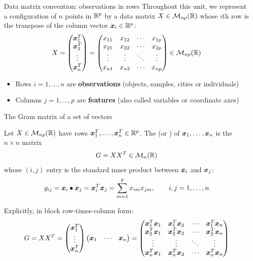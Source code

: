 \documentclass[aspectratio=169]{beamer}\usepackage[]{graphicx}\usepackage[]{xcolor}
\begin{document}


\begin{frame}{Data matrix convention: observations in rows}
Throughout this unit, we represent a configuration of $n$ points in $\mathbb{R}^p$ by a data matrix $X\in\mathcal{M}_{np}(\mathbb{R})$ whose $i$th row is the transpose of the column vector $\bm{x}_i\in\mathbb{R}^p$:
\[
X = \begin{pmatrix}
\bm{x}_1^T \\
\bm{x}_2^T \\
\vdots \\
\bm{x}_n^T
\end{pmatrix}
= \begin{pmatrix}
x_{11} & x_{12} & \cdots & x_{1p} \\
x_{21} & x_{22} & \cdots & x_{2p} \\
\vdots & \vdots & \ddots & \vdots \\
x_{n1} & x_{n2} & \cdots & x_{np}
\end{pmatrix} \in \mathcal{M}_{np}(\mathbb{R})
\]
\vfill
\begin{itemize}
\item Rows $i=1,\ldots,n$ are \textbf{observations} (objects, samples, cities or individuals)
\item Columns $j=1,\ldots,p$ are \textbf{features} (also called variables or coordinate axes)
\end{itemize}
\end{frame}

\begin{frame}{The Gram matrix of a set of vectors}
\begin{importantdefinition}
Let $X\in\mathcal{M}_{np}(\mathbb{R})$ have rows $\bm{x}_1^T,\ldots,\bm{x}_n^T\in\mathbb{R}^p$. The  (or ) of $\bm{x}_1,\ldots,\bm{x}_n$ is the $n\times n$ matrix
\[
G = XX^T \in \mathcal{M}_n(\mathbb{R})
\]
whose $(i,j)$ entry is the standard inner product between $\bm{x}_i$ and $\bm{x}_j$:
\[
g_{ij} = \bm{x}_i \bullet \bm{x}_j = \bm{x}_i^T \bm{x}_j = \sum_{m=1}^p x_{im}x_{jm}, \qquad i,j=1,\ldots,n
\]
\end{importantdefinition}
\end{frame}

\begin{frame}
Explicitly, in block row-times-column form:
\[
G = XX^T = \begin{pmatrix} \bm{x}_1^T \\ \vdots \\ \bm{x}_n^T \end{pmatrix} \begin{pmatrix} \bm{x}_1 & \cdots & \bm{x}_n \end{pmatrix}
= \begin{pmatrix}
\bm{x}_1^T\bm{x}_1 & \bm{x}_1^T\bm{x}_2 & \cdots & \bm{x}_1^T\bm{x}_n \\
\bm{x}_2^T\bm{x}_1 & \bm{x}_2^T\bm{x}_2 & \cdots & \bm{x}_2^T\bm{x}_n \\
\vdots & \vdots & \ddots & \vdots \\
\bm{x}_n^T\bm{x}_1 & \bm{x}_n^T\bm{x}_2 & \cdots & \bm{x}_n^T\bm{x}_n
\end{pmatrix}
\]
\end{frame}
\end{document}
